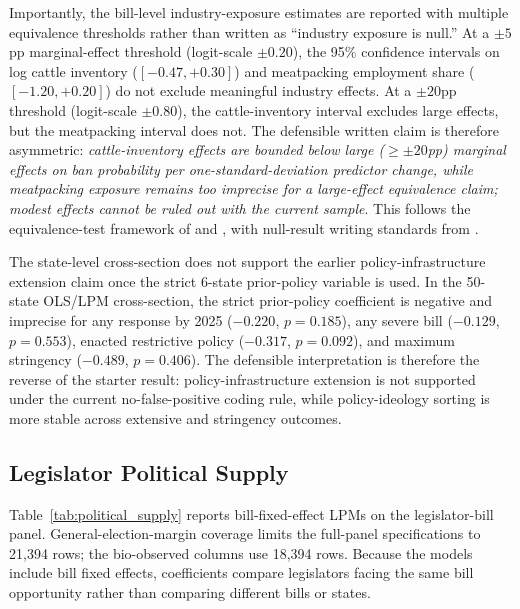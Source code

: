 \documentclass[12pt]{article}
\begin{document}
Importantly, the bill-level industry-exposure estimates are reported with multiple equivalence thresholds rather than written as ``industry exposure is null.''  At a $\pm 5$pp marginal-effect threshold (logit-scale $\pm 0.20$), the 95\% confidence intervals on log cattle inventory ($[-0.47, +0.30]$) and meatpacking employment share ($[-1.20, +0.20]$) do not exclude meaningful industry effects.  At a $\pm 20$pp threshold (logit-scale $\pm 0.80$), the cattle-inventory interval excludes large effects, but the meatpacking interval does not.  The defensible written claim is therefore asymmetric: \emph{cattle-inventory effects are bounded below large ($\geq \pm 20$pp) marginal effects on ban probability per one-standard-deviation predictor change, while meatpacking exposure remains too imprecise for a large-effect equivalence claim; modest effects cannot be ruled out with the current sample}.  This follows the equivalence-test framework of \citet{lakens2017equivalence} and \citet{hartman2018equivalence}, with null-result writing standards from \citet{rainey2014arguing}.

The state-level cross-section does not support the earlier policy-infrastructure extension claim once the strict 6-state prior-policy variable is used.  In the 50-state OLS/LPM cross-section, the strict prior-policy coefficient is negative and imprecise for any response by 2025 ($-0.220$, $p=0.185$), any severe bill ($-0.129$, $p=0.553$), enacted restrictive policy ($-0.317$, $p=0.092$), and maximum stringency ($-0.489$, $p=0.406$).  The defensible interpretation is therefore the reverse of the starter result: policy-infrastructure extension is not supported under the current no-false-positive coding rule, while policy-ideology sorting is more stable across extensive and stringency outcomes.

\subsection{Legislator Political Supply}
\label{sec:results_political_supply}

Table~\ref{tab:political_supply} reports bill-fixed-effect LPMs on the legislator-bill panel.  General-election-margin coverage limits the full-panel specifications to 21,394 rows; the bio-observed columns use 18,394 rows.  Because the models include bill fixed effects, coefficients compare legislators facing the same bill opportunity rather than comparing different bills or states.
\end{document}
